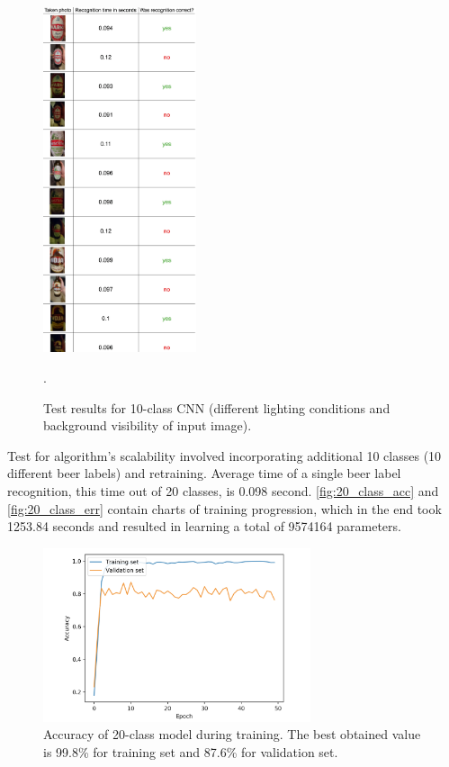\documentclass[11pt]{article}
\begin{document}
\begin{figure}[h]
\includegraphics[width=0.4\textwidth]{test_table}
\centering
\caption{Test results for 10-class CNN (different lighting conditions and background visibility of input image).}.
\label{fig:test_table}
\end{figure}

Test for algorithm's scalability involved incorporating additional 10 classes (10 different beer labels) and retraining. Average time of a single beer label recognition, this time out of 20 classes, is 0.098 second. \autoref{fig:20_class_acc} and \ref{fig:20_class_err} contain charts of training progression, which in the end took 1253.84 seconds and resulted in learning a total of 9574164 parameters.

\begin{figure}[h]
\includegraphics[width=0.7\textwidth]{20_class_acc}
\centering
\caption{Accuracy of 20-class model during training. The best obtained value is 99.8\% for training set and 87.6\% for validation set.}
\label{fig:20_class_acc}
\end{figure}
\end{document}
